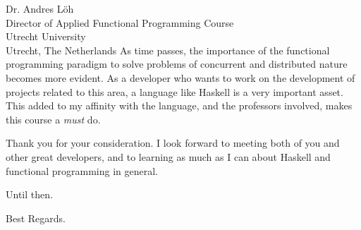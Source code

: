 \documentclass{letter} %
\begin{document}
\begin{letter}{Dr. Andres L\"oh \\
Director of Applied Functional Programming Course \\
Utrecht University \\
Utrecht, The Netherlands}
\noindent As time passes, the importance of the functional programming paradigm to solve problems of concurrent and distributed nature becomes more evident. As a developer who wants to work on the development of projects related to this area, a language like Haskell is a very important asset. This added to my affinity with the language, and the professors involved, makes this course a \emph{must} do.
 
\noindent Thank you for your consideration. I look forward to meeting both of you and other great developers, and to learning as much as I can about Haskell and functional programming in general.

Until then.

\closing{Best Regards.}

\end{letter}
 
\end{document}
